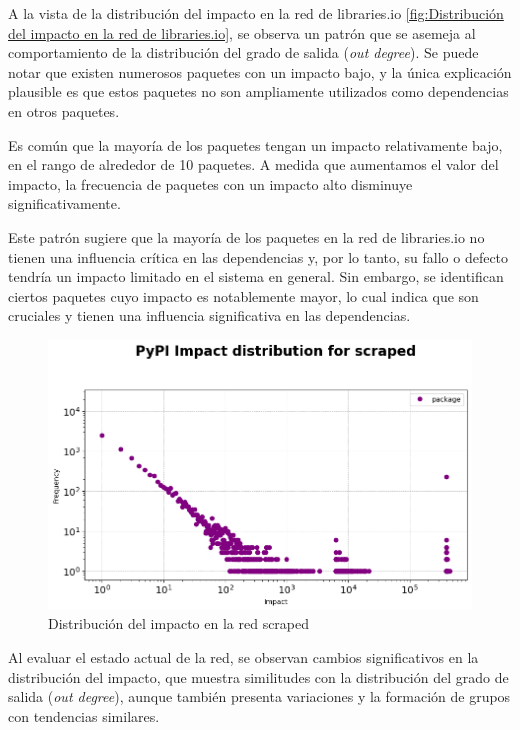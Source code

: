 A la vista de la distribución del impacto en la red de libraries.io \ref{fig:Distribución del impacto en la red de libraries.io}, se observa un patrón que se
asemeja al comportamiento de la distribución del grado de salida (\textit{out degree}). Se puede notar
que existen numerosos paquetes con un impacto bajo, y la única explicación plausible es que estos paquetes
no son ampliamente utilizados como dependencias en otros paquetes.

Es común que la mayoría de los paquetes tengan un impacto relativamente bajo, en el rango de alrededor
de 10 paquetes. A medida que aumentamos el valor del impacto, la frecuencia de paquetes con un impacto
alto disminuye significativamente.

Este patrón sugiere que la mayoría de los paquetes en la red de libraries.io no tienen una influencia
crítica en las dependencias y, por lo tanto, su fallo o defecto tendría un impacto limitado en el
sistema en general. Sin embargo, se
identifican ciertos paquetes cuyo impacto es notablemente mayor, lo cual indica que son cruciales
y tienen una influencia significativa en las dependencias.

\begin{figure}[h!]
    \begin{center}
        \includegraphics[width=1\textwidth]{img/pypi/scraped_impact_distribution.png}
        \caption{Distribución del impacto en la red scraped}
        \label{fig:Distribución del impacto en la red scraped}
    \end{center}
\end{figure}

Al evaluar el estado actual de la red, se observan cambios significativos en la distribución del
impacto, que muestra similitudes con la distribución del grado de salida (\textit{out degree}),
aunque también presenta variaciones y la formación de grupos con tendencias similares.


